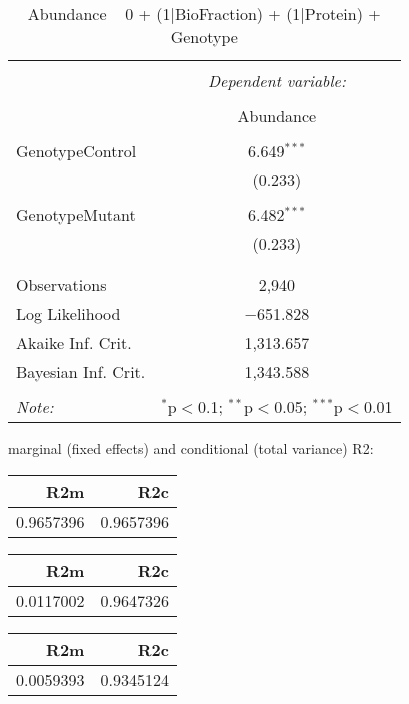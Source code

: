 \documentclass[11pt]{report}
\begin{document}
\begin{table}[!htbp] \centering 
  \caption{Abundance ~ 0 + (1|BioFraction) + (1|Protein) + Genotype} 
  \label{} 
\begin{tabular}{@{\extracolsep{5pt}}lc} 
\\[-1.8ex]\hline 
\hline \\[-1.8ex] 
 & \multicolumn{1}{c}{\textit{Dependent variable:}} \\ 
\cline{2-2} 
\\[-1.8ex] & Abundance \\ 
\hline \\[-1.8ex] 
 GenotypeControl & 6.649$^{***}$ \\ 
  & (0.233) \\ 
  & \\ 
 GenotypeMutant & 6.482$^{***}$ \\ 
  & (0.233) \\ 
  & \\ 
\hline \\[-1.8ex] 
Observations & 2,940 \\ 
Log Likelihood & $-$651.828 \\ 
Akaike Inf. Crit. & 1,313.657 \\ 
Bayesian Inf. Crit. & 1,343.588 \\ 
\hline 
\hline \\[-1.8ex] 
\textit{Note:}  & \multicolumn{1}{r}{$^{*}$p$<$0.1; $^{**}$p$<$0.05; $^{***}$p$<$0.01} \\ 
\end{tabular} 
\end{table} 
marginal (fixed effects) and conditional (total variance) R2:

\begin{tabular}{r|r}
\hline
R2m & R2c\\
\hline
0.9657396 & 0.9657396\\
\hline
\end{tabular}

\begin{tabular}{r|r}
\hline
R2m & R2c\\
\hline
0.0117002 & 0.9647326\\
\hline
\end{tabular}

\begin{tabular}{r|r}
\hline
R2m & R2c\\
\hline
0.0059393 & 0.9345124\\
\hline
\end{tabular}
\end{document}
